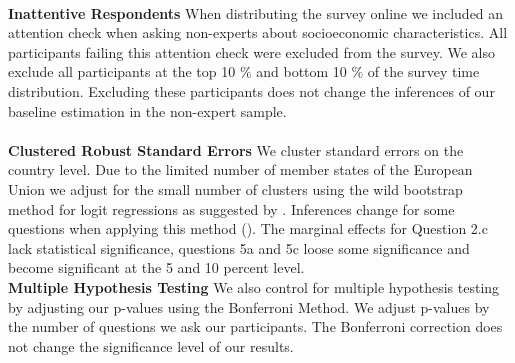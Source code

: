 \\
\textbf{Inattentive Respondents}
When distributing the survey online we included an attention check when asking non-experts about socioeconomic characteristics. All participants failing this attention check were excluded from the survey. We also exclude all participants at the top 10 $\%$ and bottom 10 $\%$ of the survey time distribution. Excluding these participants does not change the inferences of our baseline estimation in the non-expert sample.\\


\\
\textbf{Clustered Robust Standard Errors} 
We cluster standard errors on the country level. Due to the limited number of member states of the European Union we adjust for the small number of clusters using the wild bootstrap method for logit regressions as suggested by \cite{cameron}. Inferences change for some questions when applying this method (\citep{roodman}). The marginal effects for Question 2.c lack statistical significance, questions 5a and 5c loose some significance and become significant at the 5 and 10 percent level.  \\

\textbf{Multiple Hypothesis Testing}
We also control for multiple hypothesis testing by adjusting our p-values using the Bonferroni Method. We adjust p-values by the number of questions we ask our participants. The Bonferroni correction does not change the significance level of our results. 

